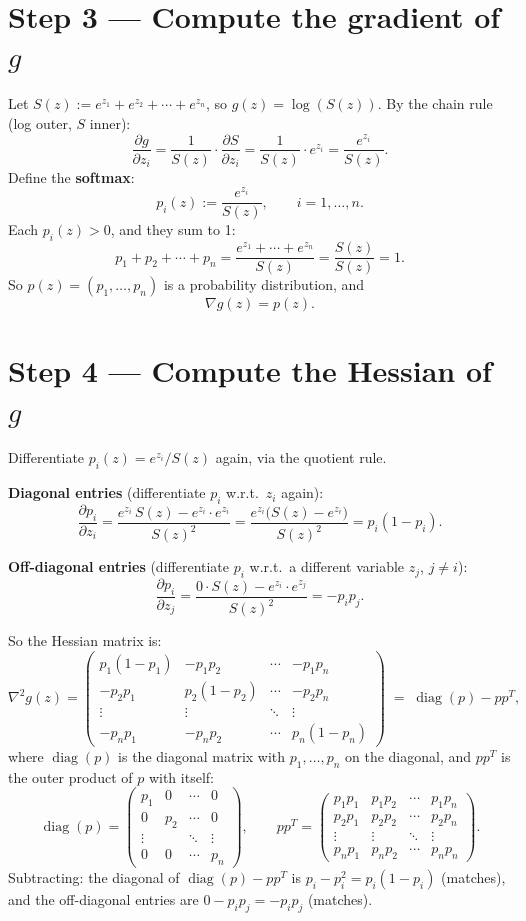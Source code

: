 \documentclass[11pt]{article}
\begin{document}
\section*{Step 3 --- Compute the gradient of $g$}

Let $S(z) := e^{z_1}+e^{z_2}+\cdots+e^{z_n}$, so $g(z)=\log(S(z))$. By the chain rule (log outer, $S$ inner):
\[
\frac{\partial g}{\partial z_i} = \frac{1}{S(z)}\cdot\frac{\partial S}{\partial z_i} = \frac{1}{S(z)}\cdot e^{z_i} = \frac{e^{z_i}}{S(z)}.
\]
Define the \textbf{softmax}:
\[
p_i(z) := \frac{e^{z_i}}{S(z)}, \qquad i=1,\dots,n.
\]
Each $p_i(z)>0$, and they sum to 1:
\[
p_1+p_2+\cdots+p_n = \frac{e^{z_1}+\cdots+e^{z_n}}{S(z)} = \frac{S(z)}{S(z)} = 1.
\]
So $p(z)=(p_1,\dots,p_n)$ is a probability distribution, and
\[
\nabla g(z) = p(z).
\]

\section*{Step 4 --- Compute the Hessian of $g$}

Differentiate $p_i(z)=e^{z_i}/S(z)$ again, via the quotient rule.

\textbf{Diagonal entries} (differentiate $p_i$ w.r.t.\ $z_i$ again):
\[
\frac{\partial p_i}{\partial z_i}
= \frac{e^{z_i}\,S(z) - e^{z_i}\cdot e^{z_i}}{S(z)^2}
= \frac{e^{z_i}\big(S(z)-e^{z_i}\big)}{S(z)^2}
= p_i(1-p_i).
\]

\textbf{Off-diagonal entries} (differentiate $p_i$ w.r.t.\ a different variable $z_j$, $j\ne i$):
\[
\frac{\partial p_i}{\partial z_j} = \frac{0\cdot S(z) - e^{z_i}\cdot e^{z_j}}{S(z)^2} = -p_ip_j.
\]

So the Hessian matrix is:
\[
\nabla^2 g(z) =
\begin{pmatrix}
p_1(1-p_1) & -p_1p_2 & \cdots & -p_1p_n \\
-p_2p_1 & p_2(1-p_2) & \cdots & -p_2p_n \\
\vdots & \vdots & \ddots & \vdots \\
-p_np_1 & -p_np_2 & \cdots & p_n(1-p_n)
\end{pmatrix}
\;=\; \operatorname{diag}(p) - pp^T,
\]
where $\operatorname{diag}(p)$ is the diagonal matrix with $p_1,\dots,p_n$ on the diagonal, and $pp^T$ is the outer product of $p$ with itself:
\[
\operatorname{diag}(p) =
\begin{pmatrix}
p_1 & 0 & \cdots & 0 \\
0 & p_2 & \cdots & 0 \\
\vdots & & \ddots & \vdots \\
0 & 0 & \cdots & p_n
\end{pmatrix},
\qquad
pp^T =
\begin{pmatrix}
p_1p_1 & p_1p_2 & \cdots & p_1p_n \\
p_2p_1 & p_2p_2 & \cdots & p_2p_n \\
\vdots & \vdots & \ddots & \vdots \\
p_np_1 & p_np_2 & \cdots & p_np_n
\end{pmatrix}.
\]
Subtracting: the diagonal of $\operatorname{diag}(p)-pp^T$ is $p_i - p_i^2 = p_i(1-p_i)$ (matches), and the off-diagonal entries are $0 - p_ip_j = -p_ip_j$ (matches).
\end{document}
